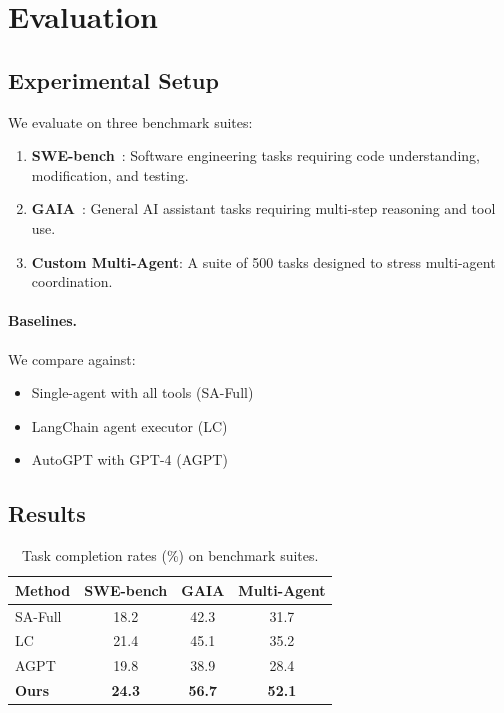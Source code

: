 \section{Evaluation}


\subsection{Experimental Setup}

We evaluate on three benchmark suites:
\begin{enumerate}
    \item \textbf{SWE-bench}~\cite{swebench2023}: Software engineering tasks requiring code understanding, modification, and testing.
    \item \textbf{GAIA}~\cite{gaia2023}: General AI assistant tasks requiring multi-step reasoning and tool use.
    \item \textbf{Custom Multi-Agent}: A suite of 500 tasks designed to stress multi-agent coordination.
\end{enumerate}

\paragraph{Baselines.} We compare against:
\begin{itemize}
    \item Single-agent with all tools (SA-Full)
    \item LangChain agent executor (LC)
    \item AutoGPT with GPT-4 (AGPT)
\end{itemize}

\subsection{Results}

\begin{table}[h]
\centering
\caption{Task completion rates (\%) on benchmark suites.}
\label{tab:completion}
\begin{tabular}{lccc}
\toprule
\textbf{Method} & \textbf{SWE-bench} & \textbf{GAIA} & \textbf{Multi-Agent} \\
\midrule
SA-Full & 18.2 & 42.3 & 31.7 \\
LC & 21.4 & 45.1 & 35.2 \\
AGPT & 19.8 & 38.9 & 28.4 \\
\midrule
\textbf{Ours} & \textbf{24.3} & \textbf{56.7} & \textbf{52.1} \\
\bottomrule
\end{tabular}
\end{table}

